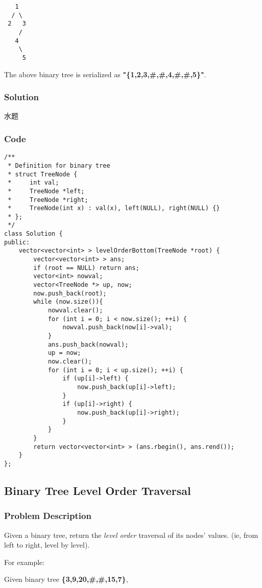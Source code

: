 \documentclass[courier]{article}
\begin{document}
\begin{CJK*}{UTF8}{gkai}
\begin{verbatim}
   1
  / \
 2   3
    /
   4
    \
     5
\end{verbatim}
The above binary tree is serialized as \textbf{"\{1,2,3,\#,\#,4,\#,\#,5\}"}.



\subsubsection*{Solution}
水题

\subsubsection*{Code}
\begin{lstlisting}
/**
 * Definition for binary tree
 * struct TreeNode {
 *     int val;
 *     TreeNode *left;
 *     TreeNode *right;
 *     TreeNode(int x) : val(x), left(NULL), right(NULL) {}
 * };
 */
class Solution {
public:
    vector<vector<int> > levelOrderBottom(TreeNode *root) {
        vector<vector<int> > ans;
        if (root == NULL) return ans;
        vector<int> nowval;
        vector<TreeNode *> up, now;
        now.push_back(root);
        while (now.size()){
            nowval.clear();
            for (int i = 0; i < now.size(); ++i) {
                nowval.push_back(now[i]->val);
            }
            ans.push_back(nowval);
            up = now;
            now.clear();
            for (int i = 0; i < up.size(); ++i) {
                if (up[i]->left) {
                    now.push_back(up[i]->left);
                }
                if (up[i]->right) {
                    now.push_back(up[i]->right);
                }
            }
        }
        return vector<vector<int> > (ans.rbegin(), ans.rend());
    }
}; 
\end{lstlisting}


\subsection{ Binary Tree Level Order Traversal }

\subsubsection*{Problem Description}
Given a binary tree, return the \emph{level order} traversal of its nodes' values. (ie, from left to right, level by level).

For example:


Given binary tree \textbf{\{3,9,20,\#,\#,15,7\}},



\end{CJK*}
\end{document}
